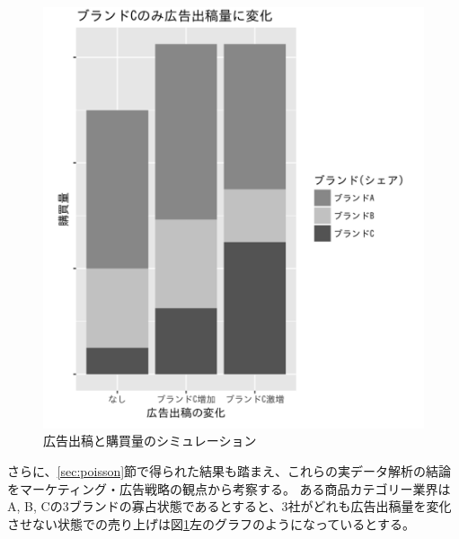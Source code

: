 \documentclass[11pt]{jsarticle}
\begin{document}
\begin{figure}[htbp]
 \centering
\begin{minipage}{0.6\columnwidth}
 \centering
 \includegraphics[width=\columnwidth]{./fig/3-4-3.png}
 \caption{広告出稿と購買量のシミュレーション}
 \label{fig:3-4-3}
\end{minipage}
\end{figure}

さらに、\ref{sec:poisson}節で得られた結果も踏まえ、これらの実データ解析の結論をマーケティング・広告戦略の観点から考察する。
ある商品カテゴリー業界はA, B, Cの3ブランドの寡占状態であるとすると、3社がどれも広告出稿量を変化させない状態での売り上げは図\ref{fig:3-4-3}左のグラフのようになっているとする。
\end{document}
